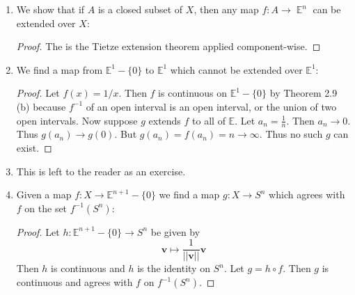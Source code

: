 \documentclass{book}
\DeclareMathOperator*{\E}{\mathbb{E}}
\begin{document}
\begin{enumerate}[(1)]
    \item We show that if $A$ is a closed subset of $X$, then any map $f: A \rightarrow \E^n$ can be extended over $X$: 
        \begin{proof} The is the Tietze extension theorem applied component-wise. 
        \end{proof}

    \item We find a map from $\mathbb E^1 - \{0\}$ to $\mathbb E^1$ which cannot be extended over $\mathbb E^1$:
        \begin{proof}  Let $f(x)=1/x$.  Then $f$ is continuous on $\mathbb E^1-\{0\}$ by Theorem 2.9 (b) because $f^{-1}$ of an open interval is an open interval, or the union of two open intervals.  Now suppose $g$ extends $f$ to all of $\mathbb E$.  Let $a_n=\frac1n$.  Then $a_n\rightarrow 0$.  Thus $g(a_n)\rightarrow g(0)$.  But $g(a_n)=f(a_n)=n\rightarrow\infty$.  Thus no such $g$ can exist.
        \end{proof}

    \item This is left to the reader as an exercise.

    \item Given a map $f:X\rightarrow \mathbb E^{n+1}-\{0\}$ we find a map $g:X\rightarrow S^n$ which agrees with $f$ on the set $f^{-1}(S^n)$: 
        \begin{proof}  Let $h:\mathbb E^{n+1}-\{0\}\rightarrow S^n$ be given by 
            \[\mathbf v\mapsto\frac{1}{||\mathbf v||}\mathbf v\]  
            Then $h$ is continuous and $h$ is the identity on $S^n$.  Let $g=h\circ f$.  Then $g$ is continuous and agrees with $f$ on $f^{-1}(S^n)$.
        \end{proof}


\end{enumerate}
\end{document}
